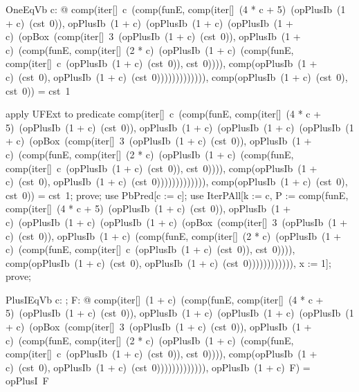 \documentclass{article}
\begin{document}
\begin{theorem}{OneEqVb}
  \forall c: \nat @ comp(iter[\nat]~c~(comp(funE, comp(iter[\nat]~(4 * c + 5)~(opPlusIb~(1 + c)~(cst~0)), opPlusIb~(1 + c)~(opPlusIb~(1 + c)~(opPlusIb~(1 + c)~(opBox~(comp(iter[\nat]~3~(opPlusIb~(1 + c)~(cst~0)), opPlusIb~(1 + c)~(comp(funE, comp(iter[\nat]~(2 * c)~(opPlusIb~(1 + c)~(comp(funE, comp(iter[\nat]~c~(opPlusIb~(1 + c)~(cst~0)), cst~0)))), comp(opPlusIb~(1 + c)~(cst~0), opPlusIb~(1 + c)~(cst~0))))))))))))), comp(opPlusIb~(1 + c)~(cst~0), cst~0)) = cst~1
\end{theorem}

\begin{zproof}
apply UFExt to predicate comp(iter[\nat]~c~(comp(funE, comp(iter[\nat]~(4 * c + 5)~(opPlusIb~(1 + c)~(cst~0)), opPlusIb~(1 + c)~(opPlusIb~(1 + c)~(opPlusIb~(1 + c)~(opBox~(comp(iter[\nat]~3~(opPlusIb~(1 + c)~(cst~0)), opPlusIb~(1 + c)~(comp(funE, comp(iter[\nat]~(2 * c)~(opPlusIb~(1 + c)~(comp(funE, comp(iter[\nat]~c~(opPlusIb~(1 + c)~(cst~0)), cst~0)))), comp(opPlusIb~(1 + c)~(cst~0), opPlusIb~(1 + c)~(cst~0))))))))))))), comp(opPlusIb~(1 + c)~(cst~0), cst~0)) = cst~1;
prove;
use PbPred[c := c];
use IterPAll[k := c, P := comp(funE, comp(iter[\nat]~(4 * c + 5)~(opPlusIb~(1 + c)~(cst~0)), opPlusIb~(1 + c)~(opPlusIb~(1 + c)~(opPlusIb~(1 + c)~(opBox~(comp(iter[\nat]~3~(opPlusIb~(1 + c)~(cst~0)), opPlusIb~(1 + c)~(comp(funE, comp(iter[\nat]~(2 * c)~(opPlusIb~(1 + c)~(comp(funE, comp(iter[\nat]~c~(opPlusIb~(1 + c)~(cst~0)), cst~0)))), comp(opPlusIb~(1 + c)~(cst~0), opPlusIb~(1 + c)~(cst~0)))))))))))), x := 1];
prove;
\end{zproof}

\begin{theorem}{PlusIEqVb}
  \forall c: \nat; F: \nat \fun \nat @ comp(iter[\nat]~(1 + c)~(comp(funE, comp(iter[\nat]~(4 * c + 5)~(opPlusIb~(1 + c)~(cst~0)), opPlusIb~(1 + c)~(opPlusIb~(1 + c)~(opPlusIb~(1 + c)~(opBox~(comp(iter[\nat]~3~(opPlusIb~(1 + c)~(cst~0)), opPlusIb~(1 + c)~(comp(funE, comp(iter[\nat]~(2 * c)~(opPlusIb~(1 + c)~(comp(funE, comp(iter[\nat]~c~(opPlusIb~(1 + c)~(cst~0)), cst~0)))), comp(opPlusIb~(1 + c)~(cst~0), opPlusIb~(1 + c)~(cst~0))))))))))))), opPlusIb~(1 + c)~F) = opPlusI~F
\end{theorem}
\end{document}
